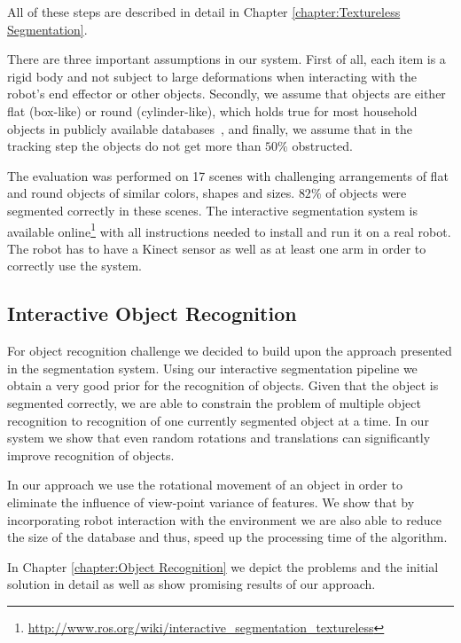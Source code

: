 All of these steps are described in detail in Chapter \ref{chapter:Textureless Segmentation}. 


There are three important assumptions in our system. First of all, each item is a rigid  body and not subject
to large deformations when  interacting with  the robot's  end  effector or
other objects. Secondly, we assume that objects are either flat (box-like) or round (cylinder-like),
which holds true for most household objects in publicly available databases~\cite{marton11ijrr}, and finally, we assume
that in the tracking step the objects do not get more than $50\%$ obstructed.

The evaluation was performed on 17 scenes with challenging arrangements of flat and
round objects of similar colors, shapes and sizes. $82\%$ of objects
were segmented correctly in these scenes. The interactive segmentation system is available online\footnote{\url{http://www.ros.org/wiki/interactive_segmentation_textureless}} with all instructions needed to install and run it on a real robot. The robot has to have a Kinect sensor as well as at least one arm in order to correctly use the system.

\subsection{Interactive Object Recognition} 

For object recognition challenge we decided to build upon the approach presented in the segmentation system. Using our interactive segmentation pipeline we obtain a very good prior for the recognition of objects. Given that the object is segmented correctly, we are able to constrain the problem of multiple object recognition to recognition of one currently segmented object at a time. In our system we show that even random rotations and translations can significantly improve recognition of objects.

In our approach we use the rotational movement of an object in order to eliminate the influence of view-point variance of features. We show that by incorporating robot interaction with the environment we are also able to reduce the size of the database and thus, speed up the processing time of the algorithm.

In Chapter \ref{chapter:Object Recognition} we depict the problems and the initial solution in detail as well as show promising results of our approach.
    















